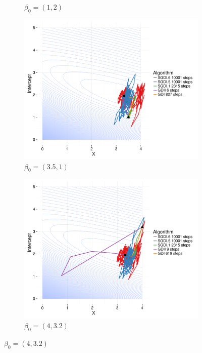 \begin{figure}[h!]
\begin{center}
\begin{subfigure}[h!]{0.49\textwidth}
        \caption{$\beta_0 = (1,2)$}
      \end{subfigure}
   \begin{subfigure}[h!]{0.49\textwidth}
           \includegraphics[width=\textwidth]{Obrazki/Numeryka/contour_35_1.pdf}
           \caption{$\beta_0 = (3.5,1)$}
                 \end{subfigure}
   \begin{subfigure}[h!]{0.49\textwidth}
              \includegraphics[width=\textwidth]{Obrazki/Numeryka/contour_4_32.pdf}
              \caption{$\beta_0 = (4,3.2)$}

\end{subfigure}
\end{center}
\end{figure}
